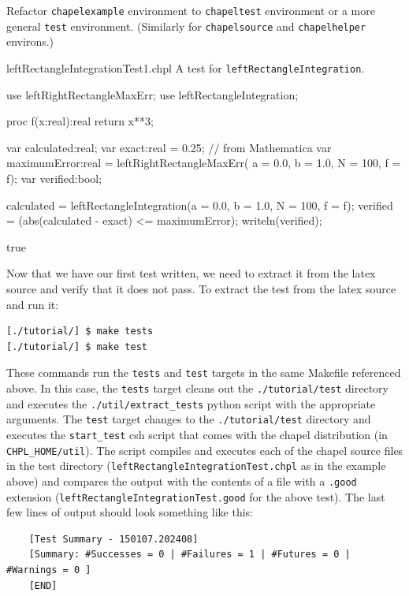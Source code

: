   \begin{TODO}
    Refactor \lstinline{chapelexample} environment to \lstinline{chapeltest} environment or
    a more general \lstinline{test} environment. (Similarly for \lstinline{chapelsource} and
    \lstinline{chapelhelper} environs.)
  \end{TODO}

  \begin{chapelexample}{leftRectangleIntegrationTest1.chpl}
    A test for \lstinline{leftRectangleIntegration}.
    \begin{chapelpre}
    \end{chapelpre}
    \begin{chapel}
use leftRightRectangleMaxErr;
use leftRectangleIntegration;

proc f(x:real):real {
  return x**3;
} 

var calculated:real;
var exact:real = 0.25;  // from Mathematica
var maximumError:real = leftRightRectangleMaxErr(
  a = 0.0, b = 1.0, N = 100, f = f);
var verified:bool;

calculated = leftRectangleIntegration(a = 0.0, b = 1.0, N = 100, f = f);
verified = (abs(calculated - exact) <= maximumError);
writeln(verified);
    \end{chapel}
    \begin{chapelpost}
    \end{chapelpost}
    \begin{chapeloutput}
true
    \end{chapeloutput}
  \end{chapelexample}

  \begin{seamlessnote}
    Now that we have our first test written, we need to extract it from the latex source and verify
    that it does not pass.
    To extract the test from the latex source and run it:
    \begin{verbatim}
[./tutorial/] $ make tests
[./tutorial/] $ make test
    \end{verbatim}
    These commands run the \verb|tests| and \verb|test| targets in the same Makefile referenced above.
    In this case, the \lstinline{tests} target cleans out the \lstinline{./tutorial/test} directory and
    executes the \lstinline{./util/extract_tests} python script with the appropriate arguments.
    The \lstinline{test} target changes to the \lstinline{./tutorial/test} directory and 
    executes the \lstinline{start_test} csh script that comes with
    the chapel distribution (in \lstinline{CHPL_HOME/util}). The script compiles and executes each of the
    chapel source files in the test directory 
    (\eg \lstinline{leftRectangleIntegrationTest.chpl} as in the example above) 
    and compares the output with the contents of a file with a \lstinline{.good} extension
    (\eg \lstinline{leftRectangleIntegrationTest.good} for the above test). 
    The last few lines of output should look something like this:
    \begin{verbatim}
    [Test Summary - 150107.202408]
    [Summary: #Successes = 0 | #Failures = 1 | #Futures = 0 | #Warnings = 0 ]
    [END]
    \end{verbatim}
  \end{seamlessnote}


